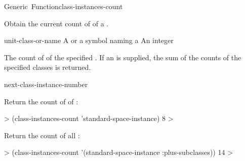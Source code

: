\documentclass[10pt,twoside,english,pdftex]{article}
\begin{document}
\begin{functiondoc}{Generic~Function}{class-instances-count}%
  { 
    \returns{} }
%
%

\fnsyntax

\fnpurpose Obtain the current count of  of a
. 

\fnmethods
{}%
  {\code{(} 
  \returns{} } 
%
  {\code{(} 
  \returns{} } 
%
  {\code{(} 
  \returns{} }

\fnpackage {}

\fnmodule {}

\fnargs
\begin{args}{unit-class-or-name}
 A  or a symbol naming a
\arg[count] An integer
\end{args}

\fnreturns The count of  of the
specified .  If an
 is supplied, the sum of the
 counts of the specified classes is returned.

\begin{alsos}{next-class-instance-number}
\end{alsos}

\fnexamples
Return the count of  of
: 
%
\W\supp
\begin{example}
  > (class-instances-count 'standard-space-instance)
  8
  >
\end{example} 
%
Return the count of all :
%
\W\supp\notpretop
\begin{example}
  > (class-instances-count '(standard-space-instance :plus-subclasses))
  14
  >
\end{example} 

\end{functiondoc}

\end{document}
